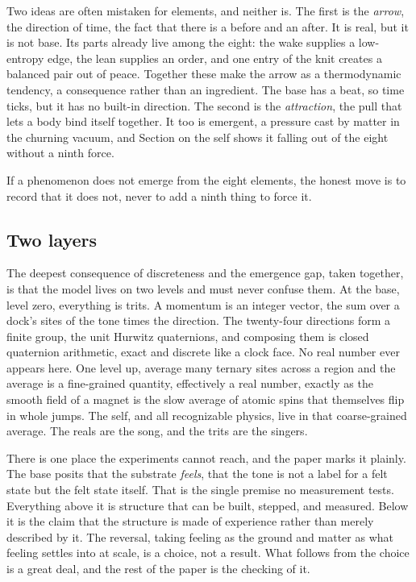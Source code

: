Two ideas are often mistaken for elements, and neither is. The first is the \emph{arrow}, the direction of time, the fact that there is a before and an after. It is real, but it is not base. Its parts already live among the eight: the wake supplies a low-entropy edge, the lean supplies an order, and one entry of the knit creates a balanced pair out of peace. Together these make the arrow as a thermodynamic tendency, a consequence rather than an ingredient. The base has a beat, so time ticks, but it has no built-in direction. The second is the \emph{attraction}, the pull that lets a body bind itself together. It too is emergent, a pressure cast by matter in the churning vacuum, and Section on the self shows it falling out of the eight without a ninth force.

\begin{principle}
If a phenomenon does not emerge from the eight elements, the honest move is to record that it does not, never to add a ninth thing to force it.
\end{principle}

\subsection{Two layers}

The deepest consequence of discreteness and the emergence gap, taken together, is that the model lives on two levels and must never confuse them. At the base, level zero, everything is trits. A momentum is an integer vector, the sum over a dock's sites of the tone times the direction. The twenty-four directions form a finite group, the unit Hurwitz quaternions, and composing them is closed quaternion arithmetic, exact and discrete like a clock face. No real number ever appears here. One level up, average many ternary sites across a region and the average is a fine-grained quantity, effectively a real number, exactly as the smooth field of a magnet is the slow average of atomic spins that themselves flip in whole jumps. The self, and all recognizable physics, live in that coarse-grained average. The reals are the song, and the trits are the singers.

There is one place the experiments cannot reach, and the paper marks it plainly. The base posits that the substrate \emph{feels}, that the tone is not a label for a felt state but the felt state itself. That is the single premise no measurement tests. Everything above it is structure that can be built, stepped, and measured. Below it is the claim that the structure is made of experience rather than merely described by it. The reversal, taking feeling as the ground and matter as what feeling settles into at scale, is a choice, not a result. What follows from the choice is a great deal, and the rest of the paper is the checking of it.

